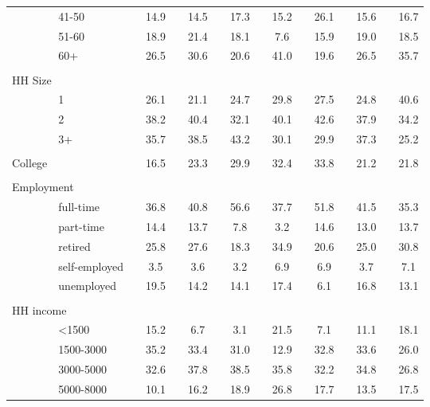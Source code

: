 \begin{table}[ht!]
{\begin{threeparttable}
\begin{tabular}{ll|cccccccccccccc}
	& 41-50 &  & 14.9 &  & 14.5 &  & 17.3 &  & 15.2 &  & 26.1 &  & 15.6 &  & 16.7 \\
	& 51-60 &  & 18.9 &  & 21.4 &  & 18.1 &  & 7.6 &  & 15.9 &  & 19.0 &  & 18.5 \\
	& 60+ &  & 26.5 &  & 30.6 &  & 20.6 &  & 41.0 &  & 19.6 &  & 26.5 &  & 35.7 \\
	&  &  &  &  &  &  &  &  &  &  &  &  &  &  &  \\
	\multicolumn{2}{l|}{HH Size} &  &  &  &  &  &  &  &  &  &  &  &  &  &  \\
	& 1 &  & 26.1 &  & 21.1 &  & 24.7 &  & 29.8 &  & 27.5 &  & 24.8 &  & 40.6 \\
	& 2 &  & 38.2 &  & 40.4 &  & 32.1 &  & 40.1 &  & 42.6 &  & 37.9 &  & 34.2 \\
	& 3+ &  & 35.7 &  & 38.5 &  & 43.2 &  & 30.1 &  & 29.9 &  & 37.3 &  & 25.2 \\
	&  &  &  &  &  &  &  &  &  &  &  &  &  &  &  \\
	College &  &  & 16.5 &  & 23.3 &  & 29.9 &  & 32.4 &  & 33.8 &  & 21.2 &  & 21.8 \\
	&  &  &  &  &  &  &  &  &  &  &  &  &  &  &  \\
	\multicolumn{2}{l|}{Employment} &  &  &  &  &  &  &  &  &  &  &  &  &  &  \\
	& full-time &  & 36.8 &  & 40.8 &  & 56.6 &  & 37.7 &  & 51.8 &  & 41.5 &  & 35.3 \\
	& part-time &  & 14.4 &  & 13.7 &  & 7.8 &  & 3.2 &  & 14.6 &  & 13.0 &  & 13.7 \\
	& retired &  & 25.8 &  & 27.6 &  & 18.3 &  & 34.9 &  & 20.6 &  & 25.0 &  & 30.8 \\
	& self-employed &  & 3.5 &  & 3.6 &  & 3.2 &  & 6.9 &  & 6.9 &  & 3.7 &  & 7.1 \\
	& unemployed &  & 19.5 &  & 14.2 &  & 14.1 &  & 17.4 &  & 6.1 &  & 16.8 &  & 13.1 \\
	&  &  &  &  &  &  &  &  &  &  &  &  &  &  &  \\
	\multicolumn{2}{l|}{HH income} &  &  &  &  &  &  &  &  &  &  &  &  &  &  \\
	& \textless{}1500 &  & 15.2 &  & 6.7 &  & 3.1 &  & 21.5 &  & 7.1 &  & 11.1 &  & 18.1 \\
	& 1500-3000 &  & 35.2 &  & 33.4 &  & 31.0 &  & 12.9 &  & 32.8 &  & 33.6 &  & 26.0 \\
	& 3000-5000 &  & 32.6 &  & 37.8 &  & 38.5 &  & 35.8 &  & 32.2 &  & 34.8 &  & 26.8 \\
	& 5000-8000 &  & 10.1 &  & 16.2 &  & 18.9 &  & 26.8 &  & 17.7 &  & 13.5 &  & 17.5 \\

\end{tabular}
\end{threeparttable}}
\end{table}
